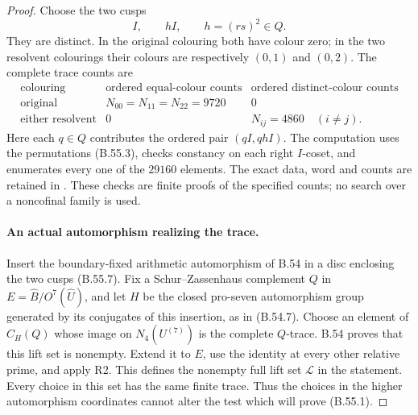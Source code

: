 \begin{proof}
Choose the two cusps
\[
                         I,\qquad hI,
                         \qquad h=(rs)^2\in Q.             \tag{B.55.7}
\]
They are distinct. In the original colouring both have
colour zero; in the two resolvent colourings their
colours are respectively $(0,1)$ and $(0,2)$.
The complete trace counts are
\[
\begin{array}{c|c|c}
 \text{colouring}&\text{ordered equal-colour counts}
                         &\text{ordered distinct-colour counts}\\ \hline
 \text{original}&N_{00}=N_{11}=N_{22}=9720&0\\
 \text{either resolvent}&0&N_{ij}=4860\quad(i\ne j).
\end{array}                                                 \tag{B.55.8}
\]
Here each $q\in Q$ contributes the ordered pair
$(qI,qhI)$. The computation uses the permutations
(B.55.3), checks constancy on each right $I$-coset,
and enumerates every one of the $29160$ elements.
The exact data, word and counts are retained in
.
These checks are finite proofs of the specified counts;
no search over a noncofinal family is used.

\paragraph{An actual automorphism realizing the trace.}
Insert the boundary-fixed arithmetic automorphism of B.54
in a disc enclosing the two cusps (B.55.7). Fix a
Schur--Zassenhaus complement $Q$ in
$E=\widehat B/O^7(\widehat U)$, and let $H$ be the closed
pro-seven automorphism group generated by its conjugates
of this insertion, as in (B.54.7).
Choose an element of $C_H(Q)$ whose image on
$N_4(U^{(7)})$ is the complete $Q$-trace.
B.54 proves that this lift set is nonempty.
Extend it to $E$, use the identity at every other relative
prime, and apply R2. This defines the nonempty full lift
set $\mathscr L$ in the statement. Every choice in this
set has the same finite trace. Thus the choices in the
higher automorphism coordinates cannot alter the test
which will prove (B.55.1).


\end{proof}

